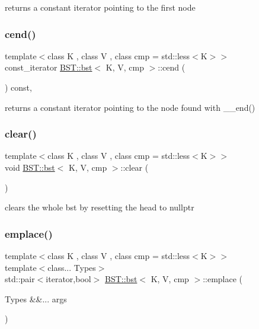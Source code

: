 returns a constant iterator pointing to the first node \mbox{\label{classBST_1_1bst_a17559d18bdbc5db5b77537a7044e449d}} 
\subsubsection{\texorpdfstring{cend()}{cend()}}
{\footnotesize\ttfamily template$<$class K , class V , class cmp  = std\+::less$<$\+K$>$$>$ \\
const\+\_\+iterator \hyperlink{classBST_1_1bst}{B\+S\+T\+::bst}$<$ K, V, cmp $>$\+::cend (\begin{DoxyParamCaption}{ }\end{DoxyParamCaption}) const\hspace{0.3cm}{\ttfamily [inline]}, {\ttfamily [noexcept]}}

returns a constant iterator pointing to the node found with \+\_\+\+\_\+end() \mbox{\label{classBST_1_1bst_a25224d3f487fe02a1be8767e4fc3b8fd}} 
\subsubsection{\texorpdfstring{clear()}{clear()}}
{\footnotesize\ttfamily template$<$class K , class V , class cmp  = std\+::less$<$\+K$>$$>$ \\
void \hyperlink{classBST_1_1bst}{B\+S\+T\+::bst}$<$ K, V, cmp $>$\+::clear (\begin{DoxyParamCaption}{ }\end{DoxyParamCaption})\hspace{0.3cm}{\ttfamily [inline]}}

clears the whole bst by resetting the head to nullptr \mbox{\label{classBST_1_1bst_a39b5fa926b67f6f4089e32aeb63a74b9}} 
\subsubsection{\texorpdfstring{emplace()}{emplace()}}
{\footnotesize\ttfamily template$<$class K , class V , class cmp  = std\+::less$<$\+K$>$$>$ \\
template$<$class... Types$>$ \\
std\+::pair$<$iterator,bool$>$ \hyperlink{classBST_1_1bst}{B\+S\+T\+::bst}$<$ K, V, cmp $>$\+::emplace (\begin{DoxyParamCaption}\item[{Types \&\&...}]{args }\end{DoxyParamCaption})\hspace{0.3cm}{\ttfamily [inline]}}

